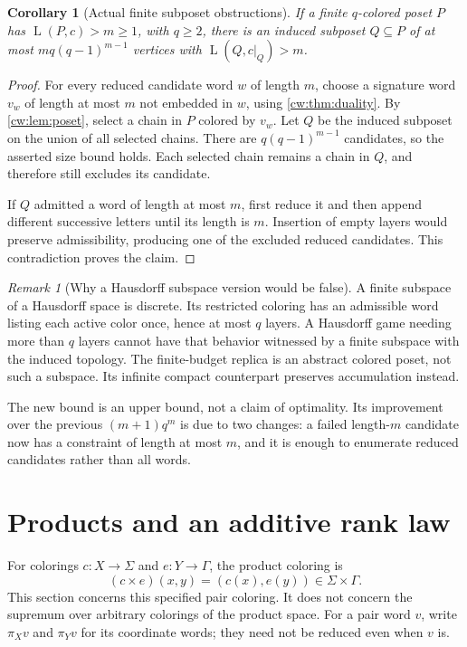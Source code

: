 \documentclass[11pt,letterpaper]{article}
\numberwithin{equation}{section}
\newtheorem{corollary}[corollary]{Corollary}
\theoremstyle{definition}
\theoremstyle{remark}
\newtheorem{remark}[remark]{Remark}
\theoremstyle{definition}
\newcommand{\layers}{\operatorname{L}}
\begin{document}
\begin{corollary}[Actual finite subposet obstructions]\label{cw:cor:obstruction}
If a finite $q$-colored poset $P$ has $\layers(P,c)>m\ge1$, with $q\ge2$,
there is an induced subposet $Q\subseteq P$ of at most
$mq(q-1)^{m-1}$ vertices with $\layers(Q,c|_Q)>m$.
\end{corollary}
\begin{proof}
For every reduced candidate word $w$ of length $m$, choose a signature word
$v_w$ of length at most $m$ not embedded in $w$, using \cref{cw:thm:duality}.
By \cref{cw:lem:poset}, select a chain in $P$ colored by $v_w$. Let $Q$ be
the induced subposet on the union of all selected chains. There are
$q(q-1)^{m-1}$ candidates, so the asserted size bound holds. Each selected
chain remains a chain in $Q$, and therefore still excludes its candidate.

If $Q$ admitted a word of length at most $m$, first reduce it and then
append different successive letters until its length is $m$. Insertion of
empty layers would preserve admissibility, producing one of the excluded
reduced candidates. This contradiction proves the claim.
\end{proof}

\begin{remark}[Why a Hausdorff subspace version would be false]
A finite subspace of a Hausdorff space is discrete. Its restricted coloring
has an admissible word listing each active color once, hence at most $q$
layers. A Hausdorff game needing more than $q$ layers cannot have that
behavior witnessed by a finite subspace with the induced topology.
The finite-budget replica is an abstract colored poset, not such a subspace.
Its infinite compact counterpart preserves accumulation instead.
\end{remark}

The new bound is an upper bound, not a claim of optimality. Its improvement
over the previous $(m+1)q^m$ is due to two changes: a failed length-$m$
candidate now has a constraint of length at most $m$, and it is enough to
enumerate reduced candidates rather than all words.

\section{Products and an additive rank law}
\label{cw:sec:products}

For colorings $c:X\to\Sigma$ and $e:Y\to\Gamma$, the product coloring is
\[
 (c\times e)(x,y)=(c(x),e(y))\in\Sigma\times\Gamma.
\]
This section concerns this specified pair coloring. It does not concern the
supremum over arbitrary colorings of the product space.
For a pair word $v$, write $\pi_Xv$ and $\pi_Yv$ for its coordinate words;
they need not be reduced even when $v$ is.
\end{document}
